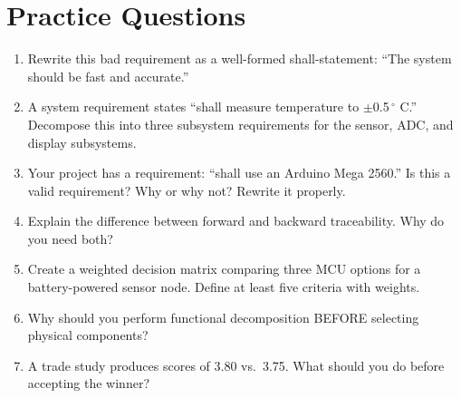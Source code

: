 \section{Practice Questions}
\begin{enumerate}[leftmargin=1.5em]
\item Rewrite this bad requirement as a well-formed shall-statement: ``The system should be fast and accurate.''
\item A system requirement states ``shall measure temperature to $\pm$0.5\,$^{\circ}$ C.'' Decompose this into three subsystem requirements for the sensor, ADC, and display subsystems.
\item Your project has a requirement: ``shall use an Arduino Mega 2560.'' Is this a valid requirement? Why or why not? Rewrite it properly.
\item Explain the difference between forward and backward traceability. Why do you need both?
\item Create a weighted decision matrix comparing three MCU options for a battery-powered sensor node. Define at least five criteria with weights.
\item Why should you perform functional decomposition BEFORE selecting physical components?
\item A trade study produces scores of 3.80 vs.\ 3.75. What should you do before accepting the winner?
\end{enumerate}

